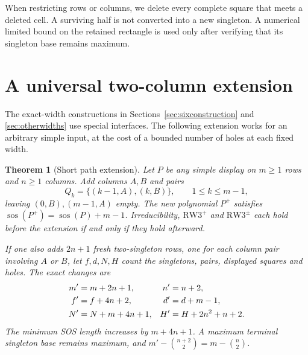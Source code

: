 \documentclass[11pt,a4paper]{article}
\newtheorem{theorem}{Theorem}[section]
\theoremstyle{definition}
\newcommand{\sos}{\operatorname{sos}}
\newcommand{\RW}{\mathrm{RW3}^{+}}
\newcommand{\SG}{\mathrm{RW3}^{\pm}}
\begin{document}
When restricting rows or columns, we delete every complete square that
meets a deleted cell. A surviving half is not converted into a new
singleton. A numerical limited bound on the retained rectangle is used
only after verifying that its singleton base remains maximum.



\section{A universal two-column extension}\label{sec:extension}

The exact-width constructions in Sections~\ref{sec:sixconstruction} and
\ref{sec:otherwidths} use special interfaces. The following
extension works for an arbitrary simple input, at the cost of a bounded
number of holes at each fixed width.

\begin{theorem}[Short path extension]\label{thm:extension}
Let $P$ be any simple display on $m\ge1$ rows and $n\ge1$ columns.
Add columns $A,B$ and pairs
\[
 Q_k=\{(k-1,A),(k,B)\},\qquad1\le k\le m-1,
\]
leaving $(0,B),(m-1,A)$ empty. The new polynomial $P^+$ satisfies
$\sos(P^+)=\sos(P)+m-1$. Irreducibility, $\RW$ and $\SG$ each hold
before the extension if and only if they hold afterward.

If one also adds $2n+1$ fresh two-singleton rows, one for each column
pair involving $A$ or $B$, let $f,d,N,H$ count the singletons, pairs,
displayed squares and holes. The exact changes are
\begin{align}\label{eq:extensioncounts}
 m'&=m+2n+1,&n'&=n+2,\notag\\
 f'&=f+4n+2,&d'&=d+m-1,\notag\\
 N'&=N+m+4n+1,&H'&=H+2n^2+n+2.
\end{align}
The minimum SOS length increases by $m+4n+1$. A maximum terminal
singleton base remains maximum, and
$m'-\binom{n+2}{2}=m-\binom n2$.
\end{theorem}
\end{document}
